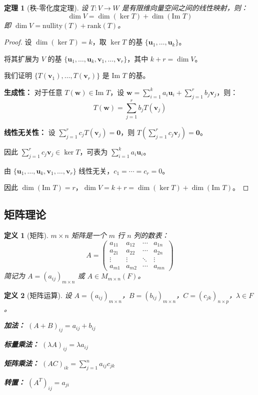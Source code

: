 \documentclass[12pt]{article}
\newtheorem{theorem}{定理}[section]
\newtheorem{definition}{定义}[section]
\begin{document}
\begin{theorem}[秩-零化度定理]
设 $T: V \to W$ 是有限维向量空间之间的线性映射，则：
$$\dim V = \dim(\ker T) + \dim(\text{Im } T)$$
即 $\dim V = \text{nullity}(T) + \text{rank}(T)$。
\end{theorem}

\begin{proof}
设 $\dim(\ker T) = k$，取 $\ker T$ 的基 $\{\mathbf{u}_1, \ldots, \mathbf{u}_k\}$。

将其扩展为 $V$ 的基 $\{\mathbf{u}_1, \ldots, \mathbf{u}_k, \mathbf{v}_1, \ldots, \mathbf{v}_r\}$，其中 $k + r = \dim V$。

我们证明 $\{T(\mathbf{v}_1), \ldots, T(\mathbf{v}_r)\}$ 是 $\text{Im } T$ 的基。

\textbf{生成性：} 对于任意 $T(\mathbf{w}) \in \text{Im } T$，设 $\mathbf{w} = \sum_{i=1}^{k} a_i\mathbf{u}_i + \sum_{j=1}^{r} b_j\mathbf{v}_j$，则：
$$T(\mathbf{w}) = \sum_{j=1}^{r} b_j T(\mathbf{v}_j)$$

\textbf{线性无关性：} 设 $\sum_{j=1}^{r} c_j T(\mathbf{v}_j) = \mathbf{0}$，则 $T(\sum_{j=1}^{r} c_j\mathbf{v}_j) = \mathbf{0}$。

因此 $\sum_{j=1}^{r} c_j\mathbf{v}_j \in \ker T$，可表为 $\sum_{i=1}^{k} a_i\mathbf{u}_i$。

由 $\{\mathbf{u}_1, \ldots, \mathbf{u}_k, \mathbf{v}_1, \ldots, \mathbf{v}_r\}$ 线性无关，$c_1 = \cdots = c_r = 0$。

因此 $\dim(\text{Im } T) = r$，$\dim V = k + r = \dim(\ker T) + \dim(\text{Im } T)$。
\end{proof}

\subsection{矩阵理论}

\begin{definition}[矩阵]
$m \times n$ 矩阵是一个 $m$ 行 $n$ 列的数表：
$$A = \begin{pmatrix}
a_{11} & a_{12} & \cdots & a_{1n} \\
a_{21} & a_{22} & \cdots & a_{2n} \\
\vdots & \vdots & \ddots & \vdots \\
a_{m1} & a_{m2} & \cdots & a_{mn}
\end{pmatrix}$$
简记为 $A = (a_{ij})_{m \times n}$ 或 $A \in M_{m \times n}(F)$。
\end{definition}

\begin{definition}[矩阵运算]
设 $A = (a_{ij})_{m \times n}$，$B = (b_{ij})_{m \times n}$，$C = (c_{jk})_{n \times p}$，$\lambda \in F$。

\textbf{加法：} $(A + B)_{ij} = a_{ij} + b_{ij}$

\textbf{标量乘法：} $(\lambda A)_{ij} = \lambda a_{ij}$

\textbf{矩阵乘法：} $(AC)_{ik} = \sum_{j=1}^{n} a_{ij} c_{jk}$

\textbf{转置：} $(A^T)_{ij} = a_{ji}$
\end{definition}
\end{document}
